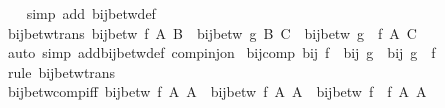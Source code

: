 \begin{isabellebody}
%
\isadelimproof
\ \ %
\endisadelimproof
%
\isatagproof
{}\isamarkupfalse%
\ {\isacharparenleft}{\kern0pt}simp\ add{\isacharcolon}{\kern0pt}\ bij{\isacharunderscore}{\kern0pt}betw{\isacharunderscore}{\kern0pt}def{\isacharparenright}{\kern0pt}%
\endisatagproof
{\isafoldproof}%
%
\isadelimproof
\isanewline
%
\endisadelimproof
\isanewline
{}\isamarkupfalse%
\ bij{\isacharunderscore}{\kern0pt}betw{\isacharunderscore}{\kern0pt}trans{\isacharcolon}{\kern0pt}\ {\isachardoublequoteopen}bij{\isacharunderscore}{\kern0pt}betw\ f\ A\ B\ {\isasymLongrightarrow}\ bij{\isacharunderscore}{\kern0pt}betw\ g\ B\ C\ {\isasymLongrightarrow}\ bij{\isacharunderscore}{\kern0pt}betw\ {\isacharparenleft}{\kern0pt}g\ {\isasymcirc}\ f{\isacharparenright}{\kern0pt}\ A\ C{\isachardoublequoteclose}\isanewline
%
\isadelimproof
\ \ %
\endisadelimproof
%
\isatagproof
{}\isamarkupfalse%
\ {\isacharparenleft}{\kern0pt}auto\ simp\ add{\isacharcolon}{\kern0pt}bij{\isacharunderscore}{\kern0pt}betw{\isacharunderscore}{\kern0pt}def\ comp{\isacharunderscore}{\kern0pt}inj{\isacharunderscore}{\kern0pt}on{\isacharparenright}{\kern0pt}%
\endisatagproof
{\isafoldproof}%
%
\isadelimproof
\isanewline
%
\endisadelimproof
\isanewline
{}\isamarkupfalse%
\ bij{\isacharunderscore}{\kern0pt}comp{\isacharcolon}{\kern0pt}\ {\isachardoublequoteopen}bij\ f\ {\isasymLongrightarrow}\ bij\ g\ {\isasymLongrightarrow}\ bij\ {\isacharparenleft}{\kern0pt}g\ {\isasymcirc}\ f{\isacharparenright}{\kern0pt}{\isachardoublequoteclose}\isanewline
%
\isadelimproof
\ \ %
\endisadelimproof
%
\isatagproof
{}\isamarkupfalse%
\ {\isacharparenleft}{\kern0pt}rule\ bij{\isacharunderscore}{\kern0pt}betw{\isacharunderscore}{\kern0pt}trans{\isacharparenright}{\kern0pt}%
\endisatagproof
{\isafoldproof}%
%
\isadelimproof
\isanewline
%
\endisadelimproof
\isanewline
{}\isamarkupfalse%
\ bij{\isacharunderscore}{\kern0pt}betw{\isacharunderscore}{\kern0pt}comp{\isacharunderscore}{\kern0pt}iff{\isacharcolon}{\kern0pt}\ {\isachardoublequoteopen}bij{\isacharunderscore}{\kern0pt}betw\ f\ A\ A{\isacharprime}{\kern0pt}\ {\isasymLongrightarrow}\ bij{\isacharunderscore}{\kern0pt}betw\ f{\isacharprime}{\kern0pt}\ A{\isacharprime}{\kern0pt}\ A{\isacharprime}{\kern0pt}{\isacharprime}{\kern0pt}\ {\isasymlongleftrightarrow}\ bij{\isacharunderscore}{\kern0pt}betw\ {\isacharparenleft}{\kern0pt}f{\isacharprime}{\kern0pt}\ {\isasymcirc}\ f{\isacharparenright}{\kern0pt}\ A\ A{\isacharprime}{\kern0pt}{\isacharprime}{\kern0pt}{\isachardoublequoteclose}\isanewline
%
\isadelimproof

\end{isabellebody}
